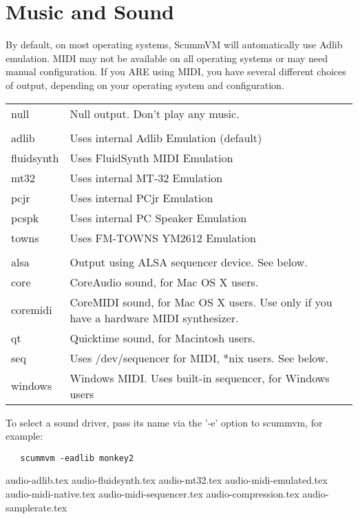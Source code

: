 


\section{Music and Sound} \label{sect-music-and-sound}

By default, on most operating systems, ScummVM will automatically use Adlib
emulation. MIDI may not be available on all operating systems or may need
manual configuration. If you ARE using MIDI, you have several different
choices of output, depending on your operating system and configuration.

\begin{tabular}[h]{ll}
  null       & Null output. Don't play any music.\\
             & \\
  adlib      & Uses internal Adlib Emulation (default)\\
  fluidsynth & Uses FluidSynth MIDI Emulation\\
  mt32       & Uses internal MT-32 Emulation\\
  pcjr       & Uses internal PCjr Emulation \\
  pcspk      & Uses internal PC Speaker Emulation\\
  towns      & Uses FM-TOWNS YM2612 Emulation\\
             & \\
  alsa       & Output using ALSA sequencer device. See below.\\
  core       & CoreAudio sound, for Mac OS X users.\\
  coremidi   & CoreMIDI sound, for Mac OS X users. Use only if you have a hardware MIDI synthesizer.\\
  qt         & Quicktime sound, for Macintosh users.\\
  seq        & Uses /dev/sequencer for MIDI, *nix users. See below.\\
  windows    & Windows MIDI. Uses built-in sequencer, for Windows users\\
\end{tabular}

To select a sound driver, pass its name via the '-e' option to scummvm,
for example:
\begin{verbatim}
   scummvm -eadlib monkey2
\end{verbatim}


 {audio-adlib.tex}
 {audio-fluidsynth.tex}
 {audio-mt32.tex}
 {audio-midi-emulated.tex}
 {audio-midi-native.tex}
 {audio-midi-sequencer.tex}
 {audio-compression.tex}
 {audio-samplerate.tex}
